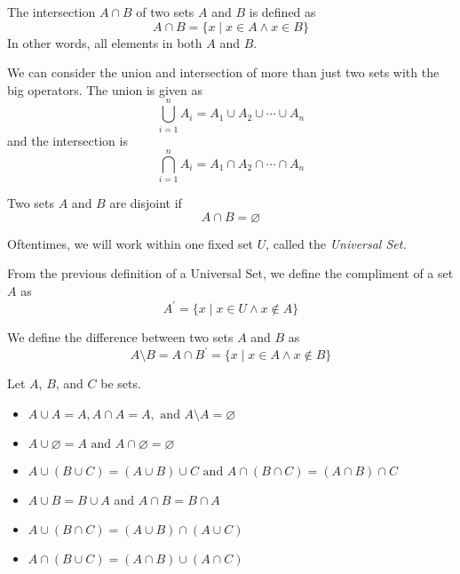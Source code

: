 \documentclass[12pt, letterpaper]{report}
\begin{document}
\begin{definition}[Intersection]
	The intersection \(A\cap B\) of two sets \(A\) and \(B\) is defined as 
	\[
		A\cap B=\{ x\mid x\in A \land x\in B \} 
	\]
	In other words, all elements in both \(A\) and \(B\).
\end{definition}
We can consider the union and intersection of more than just two sets with the big operators. The union is given as
\[
	\bigcup_{i=1}^{n} A_i =A_1 \cup A_2 \cup \cdots \cup A_n
\]
and the intersection is
\[
	\bigcap_{i=1}^{n} A_i = A_1 \cap A_2 \cap  \cdots \cap  A_n
\]
\begin{definition}[Disjoint]
	Two sets \(A\) and \(B\) are disjoint if 
	\[A\cap B=\varnothing\]
\end{definition}
Oftentimes, we will work within one fixed set \(U\), called the \emph{Universal Set.}
\begin{definition}
	From the previous definition of a Universal Set, we define the compliment of a set \(A\) as
	\[
		A^{\prime} =\{ x\mid x\in U \land x\notin A \} 
	\]
\end{definition}
\begin{definition}
	We define the difference between two sets \(A\) and \(B\) as
	\[
		A\setminus B=A\cap B^{\prime} =\{ x\mid x\in A \land  x\notin B \} 
	\]
\end{definition}
\begin{proposition}
	Let \(A\), \(B\), and \(C\) be sets.
	\begin{itemize}
		\item \(A\cup A=A,A\cap A=A,\text{ and }A\setminus A=\varnothing \) 
		\item \(A\cup \varnothing =A \text{ and } A\cap \varnothing =\varnothing \) 
		\item \(A\cup (B\cup C)=(A\cup B)\cup C\text{ and }A\cap (B\cap C)=(A\cap B)\cap C \)
		\item \(A\cup B=B\cup A\) and \(A\cap B=B\cap A\)
		\item \(A\cup (B\cap C)=(A\cup B)\cap (A\cup C)\)
		\item \(A\cap (B\cup C)=(A\cap B)\cup (A\cap C)\)
	\end{itemize}  
\end{proposition}
\end{document}
